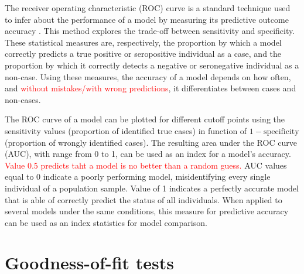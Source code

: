 The receiver operating characteristic (ROC) curve is a standard technique used to infer about the performance of a model by measuring its predictive outcome accuracy \cite{hosmer2013applied}.
This method explores the trade-off between sensitivity and specificity.
These statistical measures are, respectively, the proportion by which a model correctly predicts a true positive or seropositive individual as a case, and the proportion by which it correctly detects a negative or seronegative individual as a non-case.
Using these measures, the accuracy of a model depends on how often, and \textcolor{red}{without mistakes/with wrong predictions}, it differentiates between cases and non-cases.

The ROC curve of a model can be plotted for different cutoff points using the sensitivity values (proportion of identified true cases) in function of $1-\text{specificity}$ (proportion of wrongly identified cases).
The resulting area under the ROC curve (AUC), with range from 0 to 1, can be used as an index for a model's accuracy.
\textcolor{red}{Value 0.5 predicts taht a model is no better than a random guess.}
AUC values equal to 0 indicate a poorly performing model, misidentifying every single individual of a population sample.
Value of 1 indicates a perfectly accurate model that is able of correctly predict the status of all individuals.
When applied to several models under the same conditions, this measure for predictive accuracy can be used as an index statistics for model comparison.



\section{Goodness-of-fit tests}

